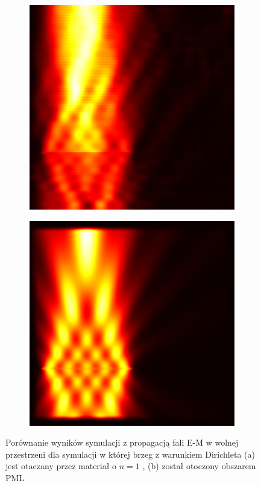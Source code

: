 \begin{figure}[tb]
	\centering
	\begin{subfigure}{0.45\textwidth}
		\includegraphics[width=\textwidth]{images/wstep/SUM-nopml-energy.png}
		\caption{}
		\label{fig:wstep-pml-bad}
	\end{subfigure}
	\begin{subfigure}{0.45\textwidth}
		\includegraphics[width=\textwidth]{images/wstep/SUM-pml-energy.png}
		\caption{}
	\end{subfigure}
	\caption{Porównanie wyników symulacji z propagacją fali E-M w wolnej przestrzeni dla symulacji w której brzeg z warunkiem Dirichleta (a) jest otaczany przez materiał o $n=1$ , (b) został otoczony obszarem PML}
\end{figure}


